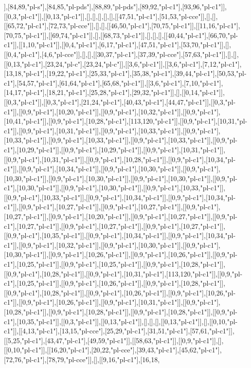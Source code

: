 ],[84,89,"pl-s"],[84,85,"pl-pds"],[88,89,"pl-pds"],[89,92,"pl-c1"],[93,96,"pl-c1"]],[[0,3,"pl-c1"]],[[0,13,"pl-c1"]],[],[],[],[],[],[[47,51,"pl-c1"],[51,53,"pl-cce"]],[],[],[[65,72,"pl-c1"],[72,73,"pl-cce"]],[],[],[[46,50,"pl-c1"],[70,75,"pl-c1"]],[[11,16,"pl-c1"],[70,75,"pl-c1"]],[[69,74,"pl-c1"]],[],[[68,73,"pl-c1"]],[],[],[],[[40,44,"pl-c1"],[66,70,"pl-c1"]],[[1,10,"pl-c1"]],[[0,4,"pl-c1"],[6,17,"pl-c1"],[47,51,"pl-c1"],[53,70,"pl-c1"]],[],[[0,4,"pl-c1"],[4,6,"pl-cce"]],[],[],[[30,37,"pl-c1"],[37,39,"pl-cce"],[57,63,"pl-c1"]],[],[],[[0,13,"pl-c1"],[23,24,"pl-c"],[23,24,"pl-c"]],[[3,6,"pl-c1"]],[[3,6,"pl-c1"],[7,12,"pl-c1"],[13,18,"pl-c1"],[19,22,"pl-c1"],[25,33,"pl-c1"],[35,38,"pl-c1"],[39,44,"pl-c1"],[50,53,"pl-c1"],[54,57,"pl-c1"],[61,64,"pl-c1"],[65,68,"pl-c1"]],[[3,6,"pl-c1"],[7,10,"pl-c1"],[14,17,"pl-c1"],[18,21,"pl-c1"],[25,28,"pl-c1"],[29,32,"pl-c1"]],[],[[0,14,"pl-c1"]],[[0,3,"pl-c1"]],[[0,3,"pl-c1"],[21,24,"pl-c1"],[40,43,"pl-c1"],[44,47,"pl-c1"]],[[0,3,"pl-c1"]],[[0,9,"pl-c1"],[10,20,"pl-c1"]],[[0,9,"pl-c1"],[10,32,"pl-c1"]],[[0,9,"pl-c1"],[10,41,"pl-c1"]],[[0,9,"pl-c1"],[10,28,"pl-c1"],[113,120,"pl-c1"]],[[0,9,"pl-c1"],[10,31,"pl-c1"]],[[0,9,"pl-c1"],[10,31,"pl-c1"]],[[0,9,"pl-c1"],[10,33,"pl-c1"]],[[0,9,"pl-c1"],[10,33,"pl-c1"]],[[0,9,"pl-c1"],[10,33,"pl-c1"]],[[0,9,"pl-c1"],[10,33,"pl-c1"]],[[0,9,"pl-c1"],[10,29,"pl-c1"]],[[0,9,"pl-c1"],[10,29,"pl-c1"]],[[0,9,"pl-c1"],[10,31,"pl-c1"]],[[0,9,"pl-c1"],[10,31,"pl-c1"]],[[0,9,"pl-c1"],[10,28,"pl-c1"]],[[0,9,"pl-c1"],[10,34,"pl-c1"]],[[0,9,"pl-c1"],[10,34,"pl-c1"]],[[0,9,"pl-c1"],[10,30,"pl-c1"]],[[0,9,"pl-c1"],[10,30,"pl-c1"]],[[0,9,"pl-c1"],[10,30,"pl-c1"]],[[0,9,"pl-c1"],[10,30,"pl-c1"]],[[0,9,"pl-c1"],[10,30,"pl-c1"]],[[0,9,"pl-c1"],[10,30,"pl-c1"]],[[0,9,"pl-c1"],[10,33,"pl-c1"]],[[0,9,"pl-c1"],[10,33,"pl-c1"]],[[0,9,"pl-c1"],[10,34,"pl-c1"]],[[0,9,"pl-c1"],[10,34,"pl-c1"]],[[0,9,"pl-c1"],[10,27,"pl-c1"]],[[0,9,"pl-c1"],[10,27,"pl-c1"]],[[0,9,"pl-c1"],[10,27,"pl-c1"]],[[0,9,"pl-c1"],[10,20,"pl-c1"]],[[0,9,"pl-c1"],[10,27,"pl-c1"]],[[0,9,"pl-c1"],[10,27,"pl-c1"]],[[0,9,"pl-c1"],[10,27,"pl-c1"]],[[0,9,"pl-c1"],[10,27,"pl-c1"]],[[0,9,"pl-c1"],[10,35,"pl-c1"]],[[0,9,"pl-c1"],[10,34,"pl-c1"]],[[0,9,"pl-c1"],[10,34,"pl-c1"]],[[0,9,"pl-c1"],[10,32,"pl-c1"]],[[0,9,"pl-c1"],[10,30,"pl-c1"]],[[0,9,"pl-c1"],[10,30,"pl-c1"]],[[0,9,"pl-c1"],[10,26,"pl-c1"]],[[0,9,"pl-c1"],[10,26,"pl-c1"]],[[0,9,"pl-c1"],[10,25,"pl-c1"]],[[0,9,"pl-c1"],[10,25,"pl-c1"]],[[0,9,"pl-c1"],[10,28,"pl-c1"]],[[0,9,"pl-c1"],[10,28,"pl-c1"]],[[0,9,"pl-c1"],[10,31,"pl-c1"],[113,120,"pl-c1"]],[[0,9,"pl-c1"],[10,25,"pl-c1"]],[[0,9,"pl-c1"],[10,26,"pl-c1"]],[[0,9,"pl-c1"],[10,28,"pl-c1"]],[[0,9,"pl-c1"],[10,28,"pl-c1"]],[[0,9,"pl-c1"],[10,26,"pl-c1"]],[[0,9,"pl-c1"],[10,26,"pl-c1"]],[[0,9,"pl-c1"],[10,26,"pl-c1"]],[[0,9,"pl-c1"],[10,31,"pl-c1"]],[[0,9,"pl-c1"],[10,28,"pl-c1"]],[[0,9,"pl-c1"],[10,28,"pl-c1"]],[[0,9,"pl-c1"],[10,28,"pl-c1"]],[[0,9,"pl-c1"],[10,35,"pl-c1"]],[[0,3,"pl-c1"]],[[0,13,"pl-c1"]],[],[],[],[[0,13,"pl-c1"]],[],[[0,10,"pl-c1"]],[[4,13,"pl-c1"],[13,15,"pl-cce"],[25,29,"pl-c1"],[31,51,"pl-c1"],[57,61,"pl-c1"]],[[5,25,"pl-c1"],[43,47,"pl-c1"],[49,59,"pl-c1"]],[[58,63,"pl-c1"]],[[0,9,"pl-c1"]],[],[[0,10,"pl-c1"]],[[16,20,"pl-c1"],[20,22,"pl-cce"],[39,43,"pl-c1"],[45,62,"pl-c1"],[72,76,"pl-c1"],[78,79,"pl-cce"]],[],[[9,16,"pl-c1"],[16,18,